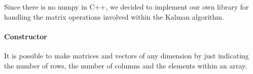 Since there is no numpy in C++, we decided to implement our own library
for handling the matrix operations involved within the Kalman algorithm.

\hypertarget{constructor}{%
\paragraph{Constructor}\label{constructor}}

It is possible to make matrices and vectors of any dimension by just
indicating the number of rows, the number of columns and the elements
within an array.

\begin{Shaded}
\begin{Highlighting}[]
\OperatorTok{(} \OperatorTok{,}  \OperatorTok{,} \OperatorTok{[])}
            \OperatorTok{:}\OperatorTok{\{}\OperatorTok{\},}\OperatorTok{\{}\OperatorTok{\}}
        \OperatorTok{\{}
\OperatorTok{=}  \OperatorTok{*[}\OperatorTok{];}
            \OperatorTok{(} \OperatorTok{=}\OperatorTok{;}\OperatorTok{\textless{}}\OperatorTok{;}\OperatorTok{++)\{}
\OperatorTok{[}\OperatorTok{]} \OperatorTok{=}  \OperatorTok{[}\OperatorTok{];}
                \OperatorTok{(} \OperatorTok{=}\OperatorTok{;}\OperatorTok{\textless{}}\OperatorTok{;}\OperatorTok{++)}
                \OperatorTok{\{}
\OperatorTok{[}\OperatorTok{][}\OperatorTok{]} \OperatorTok{=}\OperatorTok{[}\OperatorTok{+}\OperatorTok{*}\OperatorTok{];}
                \OperatorTok{\}}
            \OperatorTok{\}}
        \OperatorTok{\}}
\end{Highlighting}
\end{Shaded}

